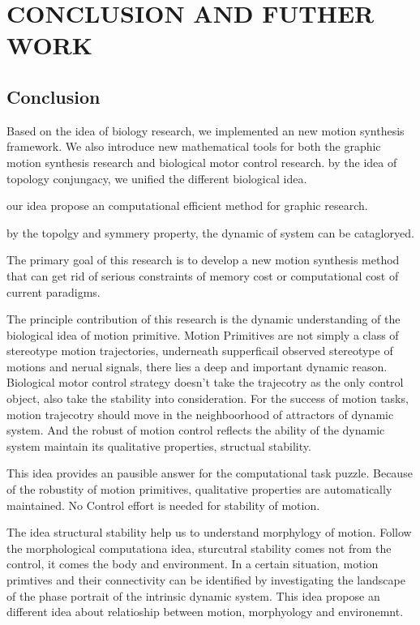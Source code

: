 \def\baselinestretch{1}
\chapter{CONCLUSION AND FUTHER WORK}
\label{chap:con}
\graphicspath{{Conclusions/ConclusionsFigs/EPS/}{Conclusions/ConclusionsFigs/}}


\def\baselinestretch{1.66}

\section{Conclusion}

Based on the idea of biology research, we implemented an new motion synthesis framework.
We also introduce new mathematical tools for both the graphic motion synthesis research and biological motor control research.
by the idea of topology conjungacy, we unified the different biological idea.

our idea propose an computational efficient method for graphic research.

by the topolgy and symmery property,
the dynamic of system can be catagloryed.





The primary goal of this research is to develop a new motion synthesis method that can get rid of serious constraints of memory cost or computational cost of current \cms paradigms.

The principle contribution of this research is the dynamic understanding of the biological idea of motion primitive.
Motion Primitives are not simply a class of stereotype motion trajectories, underneath supperficail observed stereotype of motions and nerual signals, there lies a deep and important dynamic reason.
Biological motor control strategy doesn't take the trajecotry as the only control object,  also take the stability into consideration.
For the success of motion tasks, motion trajecotry should move in the neighboorhood of attractors of dynamic system.
And the robust of motion control reflects the ability of the dynamic system maintain its qualitative properties, structual stability.


This idea provides an pausible answer for the computational task puzzle.
Because of the robustity of motion primitives, qualitative properties are automatically maintained.
No Control effort is needed for stability of motion.


The idea  structural stability help us to understand morphylogy of motion.
Follow the morphological computationa idea, sturcutral stability comes not from the control, it comes the body and environment.
In a certain situation, motion primtives and their connectivity can be identified by investigating the landscape of the phase portrait of the intrinsic dynamic system.
This idea propose an different idea about relatioship between motion, morphyology and environemnt.

